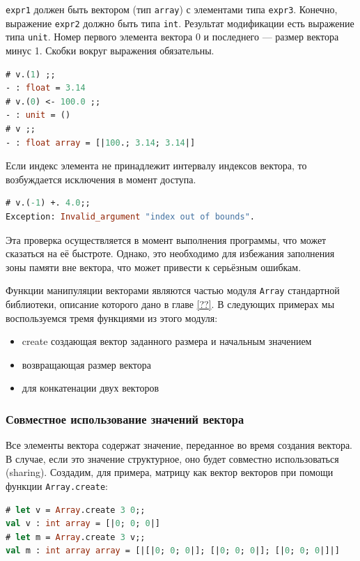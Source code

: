 \texttt{expr1} должен быть вектором (тип \texttt{array}) с элементами типа
\texttt{expr3}. Конечно, выражение \texttt{expr2} должно быть типа \texttt{int}.
Результат модификации есть выражение типа \texttt{unit}. Номер первого элемента
вектора 0 и последнего --- размер вектора минус 1. Скобки вокруг выражения
обязательны.


\begin{lstlisting}[language=OCaml]
# v.(1) ;;
- : float = 3.14
# v.(0) <- 100.0 ;;
- : unit = ()
# v ;;
- : float array = [|100.; 3.14; 3.14|]
\end{lstlisting}

Если индекс элемента не принадлежит интервалу индексов вектора, то возбуждается
исключения в момент доступа.

\begin{lstlisting}[language=OCaml]
# v.(-1) +. 4.0;;
Exception: Invalid_argument "index out of bounds".
\end{lstlisting}

Эта проверка осуществляется в момент выполнения программы, что может сказаться
на её быстроте. Однако, это необходимо для избежания заполнения зоны памяти вне
вектора, что может привести к серьёзным ошибкам.

Функции манипуляции векторами являются частью модуля \texttt{Array} стандартной
библиотеки, описание которого дано в главе \ref{??}. В следующих примерах мы
воспользуемся тремя функциями из этого модуля:

\begin{itemize}
	\item create создающая вектор заданного размера и начальным значением

	\item возвращающая размер вектора

	\item для конкатенации двух векторов 
\end{itemize}

\subsubsection{Совместное использование значений вектора}

 Все элементы вектора содержат значение, переданное во время создания вектора. В
случае, если это значение структурное, оно будет совместно использоваться
(sharing). Создадим, для примера, матрицу как вектор векторов при помощи функции
\texttt{Array.create}:

\begin{lstlisting}[language=OCaml]
# let v = Array.create 3 0;;
val v : int array = [|0; 0; 0|]
# let m = Array.create 3 v;;
val m : int array array = [|[|0; 0; 0|]; [|0; 0; 0|]; [|0; 0; 0|]|]
\end{lstlisting}

